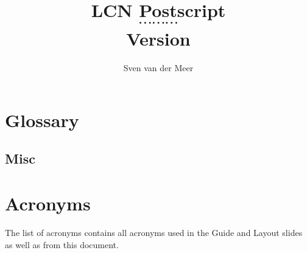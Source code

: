 \documentclass[a4paper,final,notitlepage,makeindex]{article}
\begin{document}
    \renewcommand*{\bibfont}{\citefont}
    \newcommand{\lcncite}[1]{{\citefont\cite{#1}}}

    \makeatletter
        \renewcommand{\figureautorefname}{Fig.\@gobble}
        \renewcommand{\sectionautorefname}{\S\@gobble}
        \renewcommand{\subsectionautorefname}{\S\@gobble}
        \renewcommand{\subsubsectionautorefname}{\S\@gobble}
    \makeatother

    \author{Sven van der Meer}
    \title{LCN Postscript \\ $\cdots \cdots \cdots$ \\ \small{Version }}
    \maketitle

    

    \begin{multicols}{2}
        \setcounter{tocdepth}{3}
        \tableofcontents
    \end{multicols}
    \newpage

    
    \newpage

    

    



    \section{Glossary}
        \subsection{Misc}
            

    

    


    


    

    \section{Acronyms}
        The list of acronyms contains all acronyms used in the Guide and Layout slides as well as from this document.
        \begin{multicols}{2}
            \setlength{\columnseprule}{0pt}
            \footnotesize
            
        \end{multicols}

    \printbibliography[heading=bibintoc]

    \cleardoublepage
    \printindex
\end{document}
